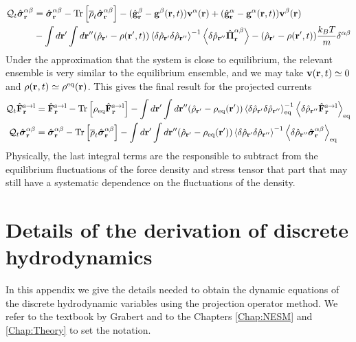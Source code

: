 \documentclass[b5paper,openright,11pt]{book}
\newcommand{\llangle}{\left\langle}
\newcommand{\rrangle}{\right\rangle}
\begin{document}
\begin{appendices}
\begin{align}
  {\cal Q}_t\hat{\boldsymbol{\sigma}}^{\alpha\beta}_{{\bf r}}&=
\hat{\boldsymbol{\sigma}}^{\alpha\beta}_{{\bf r}}-{\rm Tr}\left[\overline{\rho}_t\hat{\boldsymbol{\sigma}}^{\alpha\beta}_{{\bf r}}\right]
-(\hat{\bf g}^\beta_{{\bf r}}-{\bf g}^\beta({\bf r},t))
{\bf v}^\alpha({\bf r})+
(\hat{\bf g}^\alpha_{{\bf r}}-{\bf g}^\alpha({\bf r},t))
{\bf v}^\beta({\bf r})
\nonumber\\
&-\int d{\bf r}'\int d{\bf r}''(\hat{\rho}_{{\bf r}'}-{\rho}({\bf r}',t))
\llangle \delta\hat{\rho}_{{\bf r}'}\delta\hat{\rho}_{{\bf r}''}\rrangle^{-1}
\llangle \delta \hat{\rho}_{{\bf r}''}\hat{\boldsymbol{\Pi}}^{\alpha\beta}_{{\bf r}}\rrangle
-(\hat{\rho}_{{\bf r}'}-\rho({\bf r}',t))\frac{k_BT}{m}\delta^{\alpha\beta}
\label{QFS}
\end{align}
Under the approximation  that the system is close  to equilibrium, the
relevant ensemble is very similar  to the equilibrium ensemble, and we
may  take  ${\bf v}({\bf  r},t)\simeq  0$  and $\rho({\bf  r},t)\simeq
\rho^{\rm eq}({\bf r})$. This gives the final result for the projected
currents
\begin{align}
    {\cal Q}_t\hat{\bf F}^{\rm s\to l}_{{\bf r}}&=
\hat{\bf F}^{\rm s\to l}_{{\bf r}}- {\rm Tr}\left[\rho_{\rm eq}\hat{\bf F}^{\rm s\to l}_{{\bf r}}\right]
-\int d{\bf r}'\int d{\bf r}''(\hat{\rho}_{{\bf r}'}-{\rho}_{\rm eq}({\bf r}'))
\llangle \delta\hat{\rho}_{{\bf r}'}\delta\hat{\rho}_{{\bf r}''}\rrangle_{\rm eq}^{-1}
\llangle \delta \hat{\rho}_{{\bf r}''}\hat{\bf F}^{\rm s\to l}_{{\bf r}}\rrangle_{\rm eq}
\nonumber\\
  {\cal Q}_t\hat{\boldsymbol{\sigma}}^{\alpha\beta}_{{\bf r}}&=
\hat{\boldsymbol{\sigma}}^{\alpha\beta}_{{\bf r}}-{\rm Tr}\left[\overline{\rho}_t\hat{\boldsymbol{\sigma}}^{\alpha\beta}_{{\bf r}}\right]
-\int d{\bf r}'\int d{\bf r}''(\hat{\rho}_{{\bf r}'}-{\rho}_{\rm eq}({\bf r}'))
\llangle \delta\hat{\rho}_{{\bf r}'}\delta\hat{\rho}_{{\bf r}''}\rrangle^{-1}
\llangle \delta \hat{\rho}_{{\bf r}''}\hat{\boldsymbol{\sigma}}^{\alpha\beta}_{{\bf r}}\rrangle_{\rm eq}
\label{QFSeq}
\end{align}
Physically,  the  last integral terms    are  the  responsible  to
subtract from the  equilibrium fluctuations of the  force density and
stress tensor that part that may still have a systematic dependence on
the  fluctuations  of  the  density.  




\chapter{Details of the derivation of discrete hydrodynamics}
\label{Ap:KG}
In this  appendix we  give the  details needed  to obtain  the dynamic
equations of the discrete  hydrodynamic variables using the projection
operator   method.    We   refer   to   the    textbook   by   Grabert
\cite{Grabert1982}  and  to the Chapters \ref{Chap:NESM} and \ref{Chap:Theory} to set  the  notation.

\end{appendices}
\end{document}
